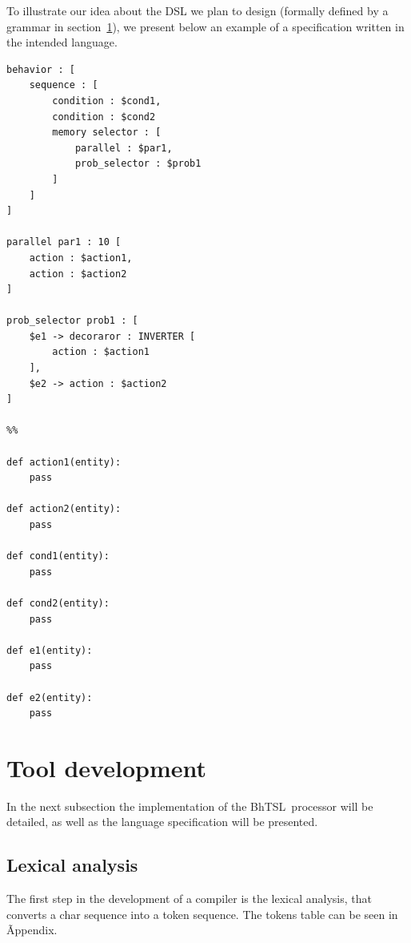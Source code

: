 \documentclass[a4paper,UKenglish,cleveref, autoref, thm-restate]{oasics-v2019}
\def\bht{BhTSL}
\begin{document}
To illustrate our idea about the DSL we plan to design (formally defined by a grammar in section~\ref{sec:tool_development}),
we present below an example of a specification written in the intended language.
\begin{lstlisting}
behavior : [
    sequence : [
        condition : $cond1,
        condition : $cond2
        memory selector : [
            parallel : $par1,
            prob_selector : $prob1
        ]
    ]
]

parallel par1 : 10 [
    action : $action1,
    action : $action2
]

prob_selector prob1 : [
    $e1 -> decoraror : INVERTER [
        action : $action1
    ],
    $e2 -> action : $action2
]

%%

def action1(entity):
    pass

def action2(entity):
    pass

def cond1(entity):
    pass

def cond2(entity):
    pass

def e1(entity):
    pass

def e2(entity):
    pass
\end{lstlisting}

\section{Tool development}
\label{sec:tool_development}
In the next subsection the implementation of the \bht\ processor will be detailed, as well as the language 
specification will be presented.

\subsection{Lexical analysis}
The first step in the development of a compiler is the lexical analysis, that converts a char sequence 
into a token sequence.
The tokens table can be seen in Ãppendix\label{apx:TokTab}.
\end{document}
